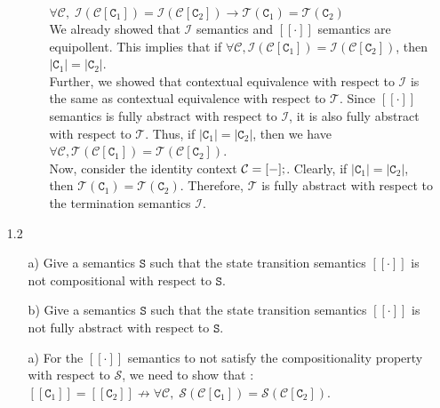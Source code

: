 \documentclass{article}
\newcommand{\C}{\mathtt{C}}
\newcommand{\Sem}{\mathtt{S}}
\newcommand{\question}[1]
{\color{DarkBlue}#1 \color{Black}}
\begin{document}
\begin{enumerate}
\begin{enumerate}
\begin{itemize}
	$\forall \mathcal{C}, \;	
	\mathcal{I}(\mathcal{C}[\C_1]) = \mathcal{I}(\mathcal{C}[\C_2])	
	\rightarrow 
	\mathcal{T}(\C_1) = \mathcal{T}(\C_2) $ \\

    We already showed that $\mathcal{I}$ semantics and $[[\cdot]]$
    semantics are equipollent.
    This implies that if $\forall \mathcal{C}, 
    \mathcal{I}(\mathcal{C}[\C_1]) = \mathcal{I}(\mathcal{C}[\C_2])$, 
    then $| \C_1 | = | \C_2 |$.\\ 

    Further, we showed that contextual equivalence with respect to $\mathcal{I}$
	is the same as contextual equivalence with respect to $\mathcal{T}$.
	Since $[[\cdot]]$ semantics is fully abstract with respect to $\mathcal{I}$, 
	it is also fully abstract with respect to $\mathcal{T}$.
	Thus, if $| \C_1 | = | \C_2 |$, then we have
	$\forall \mathcal{C},	
	\mathcal{T}(\mathcal{C}[\C_1]) = \mathcal{T}(\mathcal{C}[\C_2])$.\\	
    Now, consider the identity context $\mathcal{C} = [ \-- ];$. Clearly,
    if $| \C_1 | = | \C_2 |$, then $\mathcal{T}(\C_1) = \mathcal{T}(\C_2)$. 
    Therefore,  $\mathcal{T}$ is fully abstract with respect to the termination
	semantics $\mathcal{I}$.\\
	
\end{itemize}
\end{enumerate}

\question{	
\item[1.2]
\begin{enumerate}
	\item[a)] Give a semantics $\Sem$ such that the state transition semantics 
	$[[\cdot]]$ is not compositional with respect to $\Sem$.
	\item[b)] Give a semantics $\Sem$ such that the state transition semantics 
	$[[\cdot]]$ is not fully abstract with respect to $\Sem$.
\end{enumerate}
}

\begin{enumerate}
\item[a)] 
	For the $[[\cdot]]$ semantics to not satisfy the compositionality property
	with respect to $\mathcal{S}$, we need to show that :\\
	
	$[[\C_1]] = [[\C_2]] \nrightarrow 
	\forall \mathcal{C}, \;	
	\mathcal{S}(\mathcal{C}[\C_1]) = \mathcal{S}(\mathcal{C}[\C_2])$.\\


\end{enumerate}
\end{enumerate}
\end{document}
